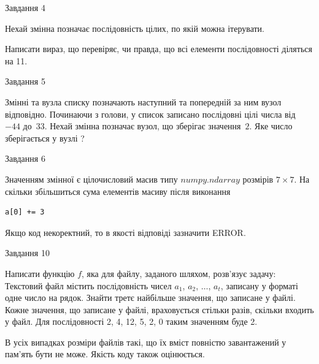 \documentclass[12pt, ukrainian]{article}
\begin{document}
{               
{\begin{center}Завдання {4}\end{center}}
\vspace{-6mm}
Нехай змінна  позначає послідовність цілих, по якій можна ітерувати.

Написати вираз, що перевіряє, чи правда, що всі елементи послідовності діляться на 11.\par

\vspace{10mm}
               
{\begin{center}Завдання {5}\end{center}}
\vspace{-6mm}
Змінні  та  вузла списку позначають наступний та попередній за ним вузол відповідно. Починаючи з голови, у список записано послідовні цілі числа від~$-44$ до~$33$. Нехай змінна  позначає вузол, що зберігає значення~$2$.
Яке число зберігається у вузлі  ?\par

               
{\begin{center}Завдання {6}\end{center}}
\vspace{-6mm}
Значенням змінної  є цілочисловий масив типу $numpy.ndarray$ розмірів $7{\times}7$. На скільки збільшиться сума елементів масиву  після виконання
\begin{verbatim}
a[0] += 3
\end{verbatim}


Якщо код некоректний, то в якості відповіді зазначити ERROR.\par

               
{\begin{center}Завдання {10}\end{center}}
\vspace{-6mm}

Написати функцію $f$, яка для файлу, заданого шляхом, розв’язує задачу:\\ Текстовий файл містить послідовність чисел $a_1$, $a_2$, $\ldots$, $a_t$, записану у форматі одне число на рядок. Знайти третє найбільше значення, що записане у файлі. Кожне значення, що записане у файлі, враховується стільки разів, скільки входить у файл. Для послідовності 2, 4, 12, 5, 2, 0 таким значенням буде 2.

В усіх випадках розміри файлів такі, що їх вміст повністю завантажений у пам'ять бути не може. Якість коду також оцінюється.



}
\end{document}
